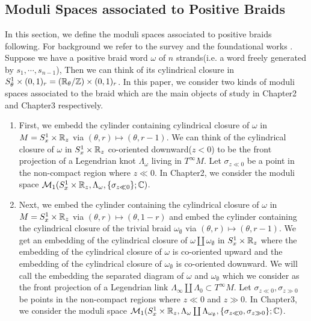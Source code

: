 \subsection*{Moduli Spaces associated to Positive Braids}
In this section, we define the moduli spaces associated to positive braids following\cite[Section~3]{shende2019cluster}. For background we refer to the survey \cite{toen2014derived} and the foundational works \cite{lurie2004derived} \cite{toen2009higher} \cite{toen2004hag} \cite{toen2005homotopical} \cite{toen2008homotopical}. Suppose we have a positive braid word $\omega$ of $n$ strands(i.e. a word freely generated by $s_1,\cdots,s_{n-1}$), Then we can think of its cylindrical closure in $S^1_\theta \times (0,1)_r = (\mathbb{R}_\theta /\mathbb{Z}) \times (0,1)_r$. In this paper, we consider two kinds of moduli spaces associated to the braid which are the main objects of study in Chapter2 and Chapter3 respectively.
\begin{enumerate}[label = (\arabic*)]
\item First, we embedd the cylinder containing cylindrical closure of $\omega$ in $M = S^1_x \times \mathbb{R}_z$ via $(\theta, r)\mapsto (\theta, r-1)$. We can think of the cylindrical closure of $\omega$ in $S^1_x \times \mathbb{R}_z$ co-oriented downward($z<0$) to be the front projection of a Legendrian knot $\Lambda_\omega$ living in $T^{\infty}M$. Let $\sigma_{z\ll 0}$ be a point in the non-compact region where $z\ll 0$. In Chapter2, we consider the moduli space $\mathcal{M}_1(S^1_x\times \mathbb{R}_z, \Lambda_\omega,\{\sigma_{z\ll 0}\};\mathbb{C})$.

\item Next, we embed the cylinder containing the cylindrical closure of $\omega$ in $M = S^1_x \times \mathbb{R}_z$ via $(\theta,r) \mapsto (\theta,1-r)$ and embed the cylinder containing the cylindrical closure of the trivial braid $\omega_\emptyset$ via $(\theta,r)\mapsto (\theta,r-1)$. We get an embedding of the cylindrical closure of $\omega \coprod \omega_\emptyset$ in $S^1_x \times \mathbb{R}_z$ where the embedding of the cylindrical closure of $\omega$ is co-oriented upward and the embedding of the cylindrical closure of $\omega_\emptyset$ is co-oriented downward. We will call the embedding the separated diagram of $\omega$ and $\omega_\emptyset$ which we consider as the front projection of a Legendrian link $\Lambda_{\infty} \coprod \Lambda_{0} \subset T^{\infty}M$. Let $\sigma_{z\ll 0},\sigma_{z\gg 0}$ be points in the non-compact regions where $z\ll 0$ and $z\gg 0$. In Chapter3, we consider the moduli space $\mathcal{M}_1(S^1_x\times \mathbb{R}_z, \Lambda_\omega \coprod \Lambda_{\omega_\emptyset},\{\sigma_{z\ll 0}, \sigma_{z\gg 0}\};\mathbb{C})$.
\end{enumerate}

